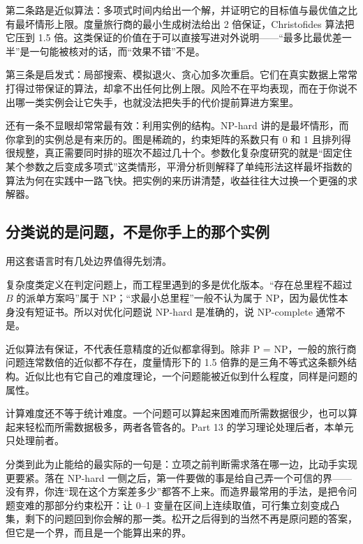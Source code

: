 第二条路是近似算法：多项式时间内给出一个解，并证明它的目标值与最优值之比有最坏情形上限。度量旅行商的最小生成树法给出 2 倍保证，Christofides 算法把它压到 1.5 倍。这类保证的价值在于可以直接写进对外说明——``最多比最优差一半''是一句能被核对的话，而``效果不错''不是。

第三条是启发式：局部搜索、模拟退火、贪心加多次重启。它们在真实数据上常常打得过带保证的算法，却拿不出任何比例上限。风险不在平均表现，而在于你说不出哪一类实例会让它失手，也就没法把失手的代价提前算进方案里。

还有一条不显眼却常常最有效：利用实例的结构。NP-hard 讲的是最坏情形，而你拿到的实例总是有来历的。图是稀疏的，约束矩阵的系数只有 0 和 1 且排列得很规整，真正需要同时排的班次不超过几十个。参数化复杂度研究的就是``固定住某个参数之后变成多项式''这类情形，平滑分析则解释了单纯形法这样最坏指数的算法为何在实践中一路飞快。把实例的来历讲清楚，收益往往大过换一个更强的求解器。

\subsection{分类说的是问题，不是你手上的那个实例}

用这套语言时有几处边界值得先划清。

复杂度类定义在判定问题上，而工程里遇到的多是优化版本。``存在总里程不超过 \(B\) 的派单方案吗''属于 NP；``求最小总里程''一般不认为属于 NP，因为最优性本身没有短证书。所以对优化问题说 NP-hard 是准确的，说 NP-complete 通常不是。

近似算法有保证，不代表任意精度的近似都拿得到。除非 P = NP，一般的旅行商问题连常数倍的近似都不存在，度量情形下的 1.5 倍靠的是三角不等式这条额外结构。近似比也有它自己的难度理论，一个问题能被近似到什么程度，同样是问题的属性。

计算难度还不等于统计难度。一个问题可以算起来困难而所需数据很少，也可以算起来轻松而所需数据极多，两者各管各的。Part 13 的学习理论处理后者，本单元只处理前者。

分类到此为止能给的最实际的一句是：立项之前判断需求落在哪一边，比动手实现更要紧。落在 NP-hard 一侧之后，第一件要做的事是给自己弄一个可信的界——没有界，你连``现在这个方案差多少''都答不上来。而造界最常用的手法，是把令问题变难的那部分约束松开：让 0--1 变量在区间上连续取值，可行集立刻变成凸集，剩下的问题回到你会解的那一类。松开之后得到的当然不再是原问题的答案，但它是一个界，而且是一个能算出来的界。
